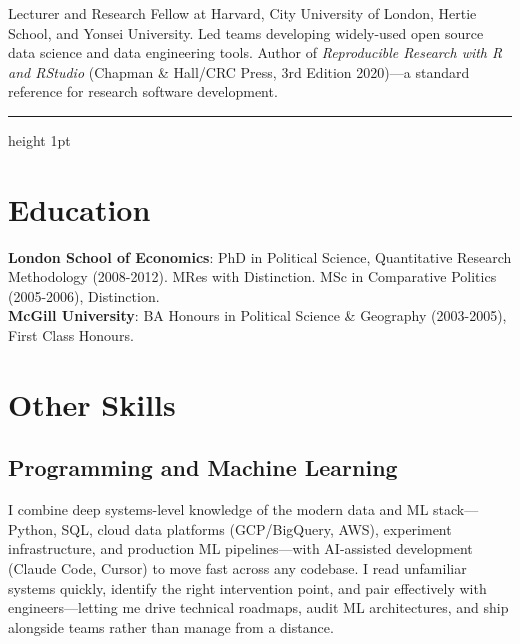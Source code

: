 \documentclass[a4paper]{article}
\begin{document}
Lecturer and Research Fellow at Harvard, City University of London, Hertie School, and Yonsei University. Led teams developing widely-used open source data science and data engineering tools. Author of \emph{Reproducible Research with R and RStudio} (Chapman \& Hall/CRC Press, 3rd Edition 2020)---a standard reference for research software development.

\vspace{0.25cm}
\medskip\hrule height 1pt
\vspace{0.5cm}

\section*{Education}

\noindent \textbf{London School of Economics}: PhD in Political Science, Quantitative Research Methodology (2008-2012). MRes with Distinction. MSc in Comparative Politics (2005-2006), Distinction. \\
\textbf{McGill University}: BA Honours in Political Science \& Geography (2003-2005), First Class Honours.

\section*{Other Skills}

\subsection*{Programming and Machine Learning}

I combine deep systems-level knowledge of the modern data and ML stack---Python, SQL, cloud data platforms (GCP/BigQuery, AWS), experiment infrastructure, and production ML pipelines---with AI-assisted development (Claude Code, Cursor) to move fast across any codebase. I read unfamiliar systems quickly, identify the right intervention point, and pair effectively with engineers---letting me drive technical roadmaps, audit ML architectures, and ship alongside teams rather than manage from a distance.
\end{document}
